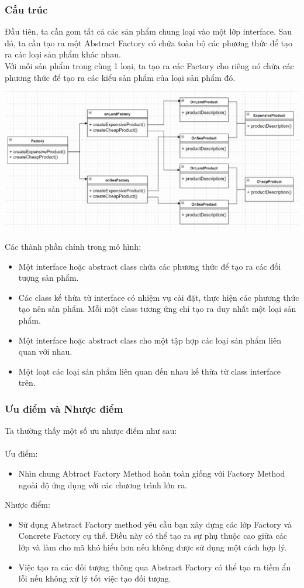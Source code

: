 \subsubsection{Cấu trúc}
Đầu tiên, ta cần gom tất cả các sản phẩm chung loại vào một lớp interface. Sau đó, ta cần tạo ra một Abstract Factory có chứa toàn bộ các phương thức để tạo ra các loại sản phẩm khác nhau.\\
Với mỗi sản phẩm trong cùng 1 loại, ta tạo ra các Factory cho riêng nó chứa các phương thức để tạo ra các kiểu sản phẩm của loại sản phẩm đó.\\
\newline
\begin{center}
\includegraphics[scale=0.60]{image/creational/afso.png}
\end{center}
Các thành phần chính trong mô hình:
\begin{itemize}
    \item Một interface hoặc abstract class chứa các phương thức để tạo ra các đối tượng sản phẩm.
    \item Các class kế thừa từ interface có nhiệm vụ cài đặt, thực hiện các phương thức tạo nên sản phẩm. Mỗi một class tương ứng chỉ tạo ra duy nhất một loại sản phẩm.
    \item Một interface hoặc abstract class cho một tập hợp các loại sản phẩm liên quan với nhau.
    \item Một loạt các loại sản phẩm liên quan đến nhau kế thừa từ class interface trên.
\end{itemize}
\subsubsection{Ưu điểm và Nhược điểm}
Ta thường thấy một số ưu nhược điểm như sau:\\\\
Ưu điểm:
\begin{itemize}
    \item Nhìn chung Abtract Factory Method hoàn toàn giống với Factory Method ngoài độ ứng dụng với các chương trình lớn ra.
\end{itemize}
Nhược điểm:
\begin{itemize}
    \item Sử dụng Abstract Factory method yêu cầu bạn xây dựng các lớp Factory và Concrete Factory cụ thể. Điều này có thể tạo ra sự phụ thuộc cao giữa các lớp và làm cho mã khó hiểu hơn nếu không được sử dụng một cách hợp lý.
    \item Việc tạo ra các đối tượng thông qua Abstract Factory có thể tạo ra tiềm ẩn lỗi nếu không xử lý tốt việc tạo đối tượng.
\end{itemize}

